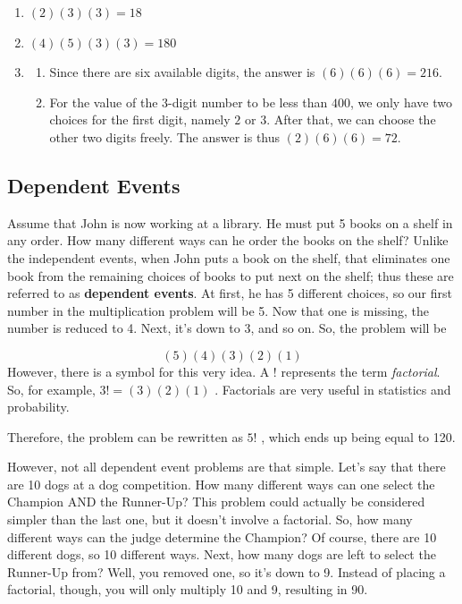 \begin{enumerate}

\item $(2)(3)(3) = 18$

\item $(4)(5)(3)(3) = 180$

\item 
\begin{enumerate}
    \item Since there are six available digits, the answer is 
    $(6)(6)(6) = 216$.
    
    \item For the value of the 3-digit number to be less than $400$, we only have two choices
    for the first digit, namely $2$ or $3$. After that, we can choose the other two digits freely.
    The answer is thus $(2)(6)(6) = 72$.
\end{enumerate}

\end{enumerate}
\subsection{Dependent Events}
\label{sss:depe-0d3a}




Assume that John is now working at a library. He must put 5 books on a shelf in any order.
How many different ways can he order the books on the shelf? Unlike the independent
events, when John puts a book on the shelf, that eliminates one book from the remaining
choices of books to put next on the shelf; thus these are referred to as \textbf{dependent
events}. At first, he has 5 different choices, so our first number in the multiplication
problem will be 5. Now that one is missing, the number is reduced to 4. Next, it's down to
3, and so on. So, the problem will be



$$(5)(4)(3)(2)(1)$$ However, there is a symbol for this very idea. A $!$ represents the
term \textit{factorial}. So, for example, $3!=(3)(2)(1)$ . Factorials are very useful in
statistics and probability.



Therefore, the problem can be rewritten as $5!$ , which ends up being equal to 120.



However, not all dependent event problems are that simple. Let's say that there are 10
dogs at a dog competition. How many different ways can one select the Champion AND the
Runner-Up? This problem could actually be considered simpler than the last one, but it
doesn't involve a factorial. So, how many different ways can the judge determine the
Champion? Of course, there are 10 different dogs, so 10 different ways. Next, how many
dogs are left to select the Runner-Up from? Well, you removed one, so it's down to 9.
Instead of placing a factorial, though, you will only multiply 10 and 9, resulting in 90.




